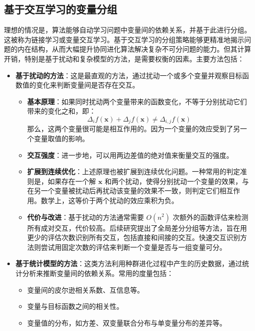 \subsection{基于交互学习的变量分组}
理想的情况是，算法能够自动学习问题中变量间的依赖关系，并基于此进行分组。这被称为链接学习或变量交互学习。基于交互学习的分组策略能够更精准地揭示问题的内在结构，从而大幅提升协同进化算法解决复杂不可分问题的能力。但其计算开销，特别是基于扰动和复杂模型的方法，是需要权衡的因素。主要方法包括：
        \begin{itemize}
            \item \textbf{基于扰动的方法}：这是最直观的方法，通过扰动一个或多个变量并观察目标函数值的变化来判断变量间是否存在交互。
            \begin{itemize}
                \item \textbf{基本原理}：如果同时扰动两个变量带来的函数变化，不等于分别扰动它们带来的变化之和，即：
                \[
                \Delta_{i}f(\mathbf{x}) + \Delta_{j}f(\mathbf{x}) \neq \Delta_{i,j}f(\mathbf{x})
                \]
                那么，这两个变量很可能是相互作用的。因为一个变量的效应受到了另一个变量取值的影响。
                \item \textbf{交互强度}：进一步地，可以用两边差值的绝对值来衡量交互的强度。
                \item \textbf{扩展到连续优化}：上述原理也被扩展到连续优化问题。一种常用的判定准则是，如果存在一个解 $\mathbf{x}$ 和两个扰动，使得分别扰动一个变量的效果，与在另一个变量被扰动后再扰动该变量的效果不一致，则判定它们相互作用。数学上，这等价于两个扰动的效应乘积为负。
                \item \textbf{代价与改进}：基于扰动的方法通常需要 $O(n^2)$ 次额外的函数评估来检测所有成对交互，代价较高。后续研究提出了全局差分分组等方法，旨在用更少的评估次数识别所有交互，包括直接和间接的交互。快速交互识别方法则尝试用固定次数的评估来判断一个变量是否与一组变量可分。
            \end{itemize}
            \item \textbf{基于统计模型的方法}：这类方法利用种群进化过程中产生的历史数据，通过统计分析来推断变量间的依赖关系。常用的度量包括：
            \begin{itemize}
                \item 变量间的皮尔逊相关系数、互信息等。
                \item 变量与目标函数之间的相关性。
                \item 变量值的分布，如方差、双变量联合分布与单变量分布的差异等。
            \end{itemize}

\end{itemize}
